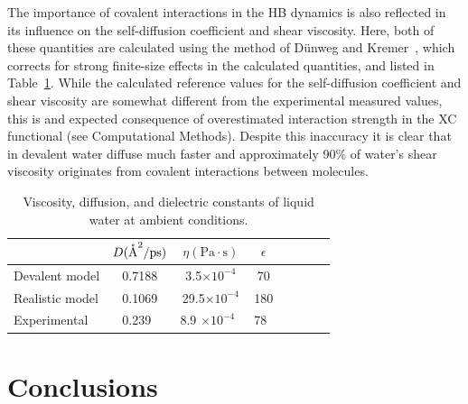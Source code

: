 \documentclass[aps,prl,reprint,amsmath,amssymb]{revtex4-1}
\begin{document}
The importance of covalent interactions in the HB dynamics is also reflected in its influence on the self-diffusion coefficient and shear viscosity. 
Here, both of these quantities are calculated using the method of D\"unweg and Kremer~\cite{dunweg1993molecular}, which corrects for strong finite-size effects in the calculated quantities, and listed in Table~\ref{Tab:dfs}. 
While the calculated reference values for the self-diffusion coefficient and shear viscosity are somewhat different from the experimental measured values, this is and expected consequence of overestimated interaction strength in the XC functional (see 
Computational Methods). 
Despite this inaccuracy it is clear that in devalent water diffuse much faster and approximately 90\% of water's shear viscosity originates from covalent interactions between molecules.

\begin{table}
\caption{Viscosity, diffusion, and dielectric constants of liquid water at ambient conditions.}\label{Tab:dfs}
\begin{tabular}{l*{6}{c}r}
\hline
               & $D (\mathring{\text{A}}^2/\text{ps})$ & $\eta (\text{Pa}\cdot \text{s})$ & $\epsilon$ \\
\hline
Devalent model                & 0.7188 & 3.5$\times 10^{-4}$ & 70 \\
%
Realistic model              & 0.1069 & 29.5$\times 10^{-4}$ & 180 \\
%
Experimental            & 0.239~\cite{hardy2001isotope}  & 8.9 $\times 10^{-4} $~\cite{harris2004temperature} & 78~\cite{haynes2014crc}
\end{tabular}
\end{table}
 
\section{Conclusions}
\end{document}
